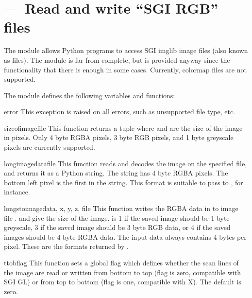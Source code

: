 \section{ ---
         Read and write ``SGI RGB'' files}



The  module allows Python programs to access SGI imglib image
files (also known as  files).  The module is far from
complete, but is provided anyway since the functionality that there is
enough in some cases.  Currently, colormap files are not supported.


The module defines the following variables and functions:

\begin{excdesc}{error}
This exception is raised on all errors, such as unsupported file type, etc.
\end{excdesc}

\begin{funcdesc}{sizeofimage}{file}
This function returns a tuple  where
 and  are the size of the image in pixels.
Only 4 byte RGBA pixels, 3 byte RGB pixels, and 1 byte greyscale pixels
are currently supported.
\end{funcdesc}

\begin{funcdesc}{longimagedata}{file}
This function reads and decodes the image on the specified file, and
returns it as a Python string. The string has 4 byte RGBA pixels.
The bottom left pixel is the first in
the string. This format is suitable to pass to ,
for instance.
\end{funcdesc}

\begin{funcdesc}{longstoimage}{data, x, y, z, file}
This function writes the RGBA data in  to image
file .  and  give the size of the image.
 is 1 if the saved image should be 1 byte greyscale, 3 if the
saved image should be 3 byte RGB data, or 4 if the saved images should
be 4 byte RGBA data.  The input data always contains 4 bytes per pixel.
These are the formats returned by .
\end{funcdesc}

\begin{funcdesc}{ttob}{flag}
This function sets a global flag which defines whether the scan lines
of the image are read or written from bottom to top (flag is zero,
compatible with SGI GL) or from top to bottom (flag is one,
compatible with X).  The default is zero.
\end{funcdesc}
